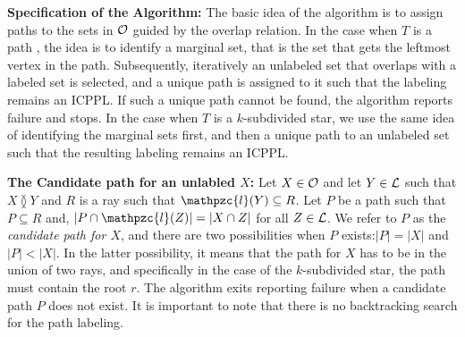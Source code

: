 \documentclass[envcountsect, envcountsame, 11pt]{../lib/llncs2e/llncs}
\def\cL{{\cal L}}
\def\cO{{\cal O}}
\def\cT{{\cal T}}
\def\cl{\mathpzc{l}}
\def\overlap{\between}
\begin{document}
\noindent
{\bf Specification of the Algorithm:}
The basic idea of the algorithm is to assign paths to the sets in $\cO$ guided by the overlap relation.  In the case when $T$ is a path \cite{nsnrs09}, the idea is to identify a marginal set, that is the set that gets the leftmost vertex in the path.  Subsequently, iteratively an unlabeled set that overlaps with a labeled set is selected, and a unique path is assigned to it such that the labeling remains an ICPPL.  If such a unique path cannot be found, the  algorithm reports failure and stops.  In the case when $T$ is a $k$-subdivided star, we use the same idea of identifying the marginal sets first, and then a unique path  to an unlabeled set such that the resulting labeling remains an ICPPL.  

\noindent
{\bf The Candidate path for an unlabled $X$:}
Let $X \in \cO$ and let $Y \in \cL$ such that $X \overlap Y$ and $R$ is a ray such that $\cl(Y) \subseteq R$.  
Let $P$ be a path such that $P \subseteq R$ and,
 $|P \cap \cl(Z)|=|X \cap Z|$ for all $Z \in \cL$.   We refer to $P$ as the {\em candidate path for $X$}, and there are two possibilities when $P$ exists:$|P|=|X|$ and $|P| < |X|$.  In the latter possibility, 
it means that the path for $X$ has to be in the union of two rays, and specifically in the case of the $k$-subdivided star, the path must contain the root $r$.    The algorithm exits reporting failure when a candidate path $P$ does not exist.
It is important to note that there is no backtracking search for the path labeling. 
\end{document}
